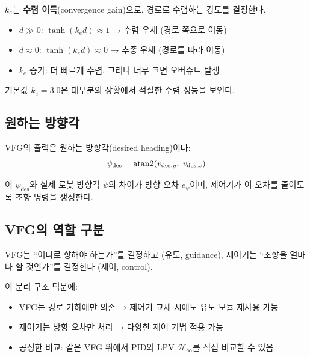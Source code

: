 $k_e$는 \textbf{수렴 이득}(convergence gain)으로, 경로로 수렴하는 강도를 결정한다.

\begin{itemize}[nosep]
    \item $d \gg 0$: $\tanh(k_e d) \approx 1$ → 수렴 우세 (경로 쪽으로 이동)
    \item $d \approx 0$: $\tanh(k_e d) \approx 0$ → 추종 우세 (경로를 따라 이동)
    \item $k_e$ 증가: 더 빠르게 수렴, 그러나 너무 크면 오버슈트 발생
\end{itemize}

기본값 $k_e = 3.0$은 대부분의 상황에서 적절한 수렴 성능을 보인다.

\subsection{원하는 방향각}

VFG의 출력은 원하는 방향각(desired heading)이다:
\begin{equation}
    \psi_\text{des} = \operatorname{atan2}\!\left(v_{\text{des},y},\; v_{\text{des},x}\right)
\end{equation}

이 $\psi_\text{des}$와 실제 로봇 방향각 $\psi$의 차이가 방향 오차 $e_\psi$이며,
제어기가 이 오차를 줄이도록 조향 명령을 생성한다.

\subsection{VFG의 역할 구분}

VFG는 ``어디로 향해야 하는가''를 결정하고 (유도, guidance),
제어기는 ``조향을 얼마나 할 것인가''를 결정한다 (제어, control).

이 분리 구조 덕분에:
\begin{itemize}[nosep]
    \item VFG는 경로 기하에만 의존 → 제어기 교체 시에도 유도 모듈 재사용 가능
    \item 제어기는 방향 오차만 처리 → 다양한 제어 기법 적용 가능
    \item 공정한 비교: 같은 VFG 위에서 PID와 LPV $\mathcal{H}_\infty$를 직접 비교할 수 있음
\end{itemize}
